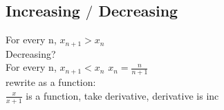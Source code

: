 \documentclass[]{report}
\begin{document}
\subsection*{Increasing $/$ Decreasing}
\noindent{}
For every n, $x_{n+1} > x_n$
\\
Decreasing? 
\\
For every n, $x_{n+1} < x_n$
\noindent{}    $x_n = \frac{n}{n+1}$ 
\\
rewrite as a function: 
\\
$\frac{x}{x+1} $ is a function, take derivative, derivative is inc 
\end{document}
